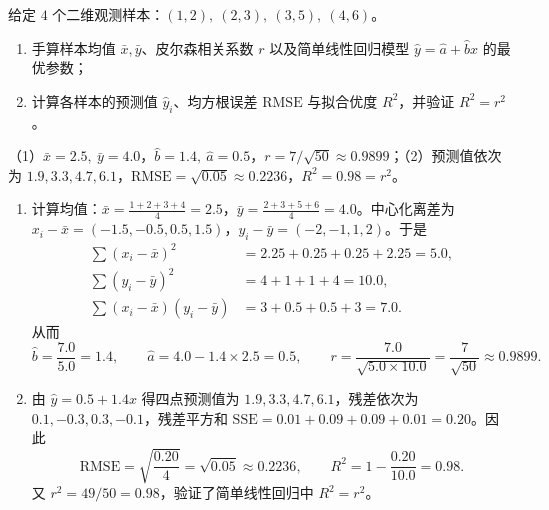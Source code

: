 \begin{exercise}[title={简单线性回归、相关系数与 $R^2$ 手算},level=standard,points=15,tags={SLR,皮尔森相关系数,RMSE,R2}]
给定 $4$ 个二维观测样本：$(1, 2),\ (2, 3),\ (3, 5),\ (4, 6)$。
\begin{enumerate}
  \item 手算样本均值 $\bar{x}, \bar{y}$、皮尔森相关系数 $r$ 以及简单线性回归模型 $\hat{y} = \hat{a} + \hat{b}x$ 的最优参数；
  \item 计算各样本的预测值 $\hat{y}_i$、均方根误差 $\mathrm{RMSE}$ 与拟合优度 $R^2$，并验证 $R^2 = r^2$。
\end{enumerate}
\begin{answer}
（1）$\bar{x}=2.5,\ \bar{y}=4.0$，$\hat{b}=1.4,\ \hat{a}=0.5$，$r = 7/\sqrt{50} \approx 0.9899$；（2）预测值依次为 $1.9, 3.3, 4.7, 6.1$，$\mathrm{RMSE} = \sqrt{0.05} \approx 0.2236$，$R^2 = 0.98 = r^2$。
\end{answer}
\begin{solution}
\begin{enumerate}
  \item 计算均值：$\bar{x} = \frac{1+2+3+4}{4} = 2.5$，$\bar{y} = \frac{2+3+5+6}{4} = 4.0$。中心化离差为 $x_i - \bar{x} = (-1.5, -0.5, 0.5, 1.5)$，$y_i - \bar{y} = (-2, -1, 1, 2)$。于是
  \[\begin{aligned}
    \sum(x_i-\bar{x})^2 &= 2.25 + 0.25 + 0.25 + 2.25 = 5.0,\\
    \sum(y_i-\bar{y})^2 &= 4 + 1 + 1 + 4 = 10.0,\\
    \sum(x_i-\bar{x})(y_i-\bar{y}) &= 3 + 0.5 + 0.5 + 3 = 7.0.
  \end{aligned}\]
  从而
  \[
    \hat{b} = \frac{7.0}{5.0} = 1.4,\qquad
    \hat{a} = 4.0 - 1.4\times 2.5 = 0.5,\qquad
    r = \frac{7.0}{\sqrt{5.0\times 10.0}} = \frac{7}{\sqrt{50}} \approx 0.9899.
  \]
  \item 由 $\hat{y} = 0.5 + 1.4x$ 得四点预测值为 $1.9, 3.3, 4.7, 6.1$，残差依次为 $0.1, -0.3, 0.3, -0.1$，残差平方和 $\mathrm{SSE} = 0.01 + 0.09 + 0.09 + 0.01 = 0.20$。因此
  \[
    \mathrm{RMSE} = \sqrt{\frac{0.20}{4}} = \sqrt{0.05} \approx 0.2236,\qquad
    R^2 = 1 - \frac{0.20}{10.0} = 0.98.
  \]
  又 $r^2 = 49/50 = 0.98$，验证了简单线性回归中 $R^2 = r^2$。
\end{enumerate}
\end{solution}
\end{exercise}


